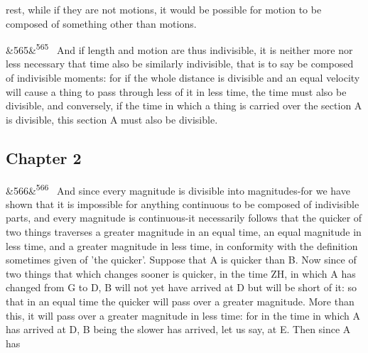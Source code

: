 \documentclass[12pt]{article}
\newcommand{\para}[1][]{\par\noindent\ifx&#1&\else\textsuperscript{\footnotesize #1}~\fi}
\begin{document}
rest, while if they are not motions, it would be possible for motion to be composed of something other than motions.

\para[565] And if length and motion are thus indivisible, it is neither more nor less necessary that time also be similarly indivisible, that is to say be composed of indivisible moments: for if the whole distance is divisible and an equal velocity will cause a thing to pass through less of it in less time, the time must also be divisible, and conversely, if the time in which a thing is carried over the section A is divisible, this section A must also be divisible.

\subsection*{Chapter 2}

\para[566] And since every magnitude is divisible into magnitudes-for we have shown that it is impossible for anything continuous to be composed of indivisible parts, and every magnitude is continuous-it necessarily follows that the quicker of two things traverses a greater magnitude in an equal time, an equal magnitude in less time, and a greater magnitude in less time, in conformity with the definition sometimes given of 'the quicker’. Suppose that A is quicker than B. Now since of two things that which changes sooner is quicker, in the time ZH, in which A has changed from G to D, B will not yet have arrived at D but will be short of it: so that in an equal time the quicker will pass over a greater magnitude. More than this, it will pass over a greater magnitude in less time: for in the time in which A has arrived at D, B being the slower has arrived, let us say, at E. Then since A has
\end{document}
